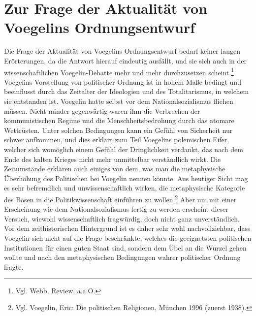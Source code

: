 \section{Zur Frage der Aktualität von Voegelins Ordnungsentwurf}

Die Frage der Aktualität von Voegelins Ordnungsentwurf bedarf keiner langen
Erörterungen, da die Antwort hierauf eindeutig ausfällt, und sie sich auch in
der wissenschaftlichen Voegelin-Debatte mehr und mehr durchzusetzen
scheint.\footnote{Vgl. Webb, Review, a.a.O.} Voegelins Vorstellung von
politischer Ordnung ist in hohem Maße bedingt und beeinflusst durch das
Zeitalter der Ideologien und des Totalitarismus, in welchem sie entstanden
ist. Voegelin hatte selbst vor dem Nationalsozialismus fliehen müssen. Nicht
minder gegenwärtig waren ihm die Verbrechen der kommunistischen Regime und die
Menschheitsbedrohung durch das atomare Wettrüsten. Unter solchen Bedingungen
kann ein Gefühl von Sicherheit nur schwer aufkommen, und dies erklärt zum Teil
Voegelins polemischen Eifer, welcher sich womöglich einem Gefühl der
Dringlichkeit verdankt, das nach dem Ende des kalten Krieges nicht mehr
unmittelbar verständlich wirkt. Die Zeitumstände erklären auch einiges von
dem, was man die metaphysische Überhöhung des Politischen bei Voegelin nennen
könnte. Aus heutiger Sicht mag es sehr befremdlich und unwissenschaftlich
wirken, die metaphysische Kategorie des Bösen in die Politikwissenschaft
einführen zu wollen.\footnote{Vgl. Voegelin, Eric: Die politischen Religionen,
  München 1996 (zuerst 1938).} Aber um mit einer Erscheinung wie dem
Nationalsozialismus fertig zu werden erscheint dieser Versuch, wiewohl
wissenschaftlich fragwürdig, doch nicht ganz unverständlich.  Vor dem
zeithistorischen Hintergrund ist es daher sehr wohl nachvollziehbar, dass
Voegelin sich nicht auf die Frage beschränkte, welches die geeignetsten
politischen Institutionen für einen guten Staat sind, sondern dem Übel an die
Wurzel gehen wollte und nach den metaphysischen Bedingungen wahrer politischer
Ordnung fragte.

